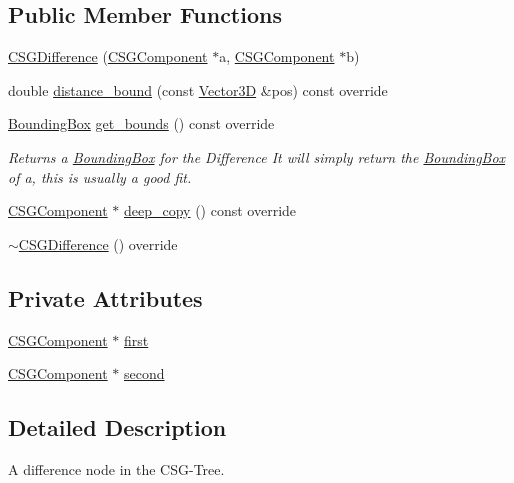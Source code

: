 \subsection*{Public Member Functions}
\begin{DoxyCompactItemize}
\item 
\mbox{\hyperlink{classCSGDifference_ac8012afd2f29b2546ce9b302c491fa42}{C\+S\+G\+Difference}} (\mbox{\hyperlink{classCSGComponent}{C\+S\+G\+Component}} $\ast$a, \mbox{\hyperlink{classCSGComponent}{C\+S\+G\+Component}} $\ast$b)
\item 
double \mbox{\hyperlink{classCSGDifference_a66e0be492572f75b508a77c429be8fd8}{distance\+\_\+bound}} (const \mbox{\hyperlink{classVector3D}{Vector3D}} \&pos) const override
\item 
\mbox{\hyperlink{classBoundingBox}{Bounding\+Box}} \mbox{\hyperlink{classCSGDifference_aede15cd9fd46e4824e66361eb2f28ec9}{get\+\_\+bounds}} () const override
\begin{DoxyCompactList}\small\item\em Returns a \mbox{\hyperlink{classBoundingBox}{Bounding\+Box}} for the Difference It will simply return the \mbox{\hyperlink{classBoundingBox}{Bounding\+Box}} of a, this is usually a good fit. \end{DoxyCompactList}\item 
\mbox{\hyperlink{classCSGComponent}{C\+S\+G\+Component}} $\ast$ \mbox{\hyperlink{classCSGDifference_a8ea1d4cd7fc1ff6adca5cc4983eecfcd}{deep\+\_\+copy}} () const override
\item 
\mbox{\hyperlink{classCSGDifference_a1f1c435a8b85ee53ee5003548e465b75}{$\sim$\+C\+S\+G\+Difference}} () override
\end{DoxyCompactItemize}
\subsection*{Private Attributes}
\begin{DoxyCompactItemize}
\item 
\mbox{\hyperlink{classCSGComponent}{C\+S\+G\+Component}} $\ast$ \mbox{\hyperlink{classCSGDifference_a689a622e9b4c43d72575cbbdd2ad847b}{first}}
\item 
\mbox{\hyperlink{classCSGComponent}{C\+S\+G\+Component}} $\ast$ \mbox{\hyperlink{classCSGDifference_ae9b4b0b0839d066ce30006d99536cd99}{second}}
\end{DoxyCompactItemize}


\subsection{Detailed Description}
A difference node in the C\+S\+G-\/\+Tree. 

